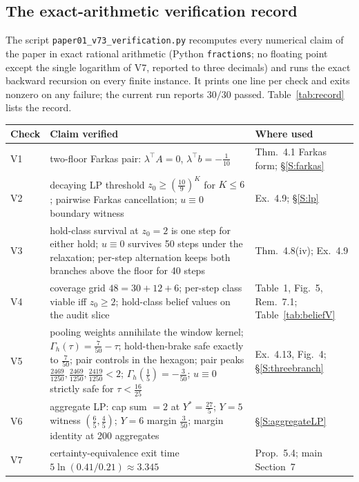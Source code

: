 \documentclass[11pt,a4paper]{article}
\theoremstyle{plain}
\theoremstyle{definition}
\theoremstyle{remark}
\begin{document}
\subsection{The exact-arithmetic verification record}\label{S:record}
The script \texttt{paper01\_v73\_verification.py} recomputes every numerical claim of the paper in exact rational arithmetic (Python \texttt{fractions}; no floating point except the single logarithm of V7, reported to three decimals) and runs the exact backward recursion on every finite instance. It prints one line per check and exits nonzero on any failure; the current run reports $30/30$ passed. Table~\ref{tab:record} lists the record.

\begin{table}[htbp]
\centering\small
\begin{tabularx}{\textwidth}{@{}l>{\raggedright\arraybackslash}X>{\raggedright\arraybackslash}p{}@{}}
\toprule
Check & Claim verified & Where used\\
\midrule
V1 & two-floor Farkas pair: $\lambda^\top A=0$, $\lambda^\top b=-\tfrac1{10}$ & Thm.~4.1 Farkas form; \S\ref{S:farkas}\\
V2 & decaying LP threshold $z_0\ge(\tfrac{10}9)^K$ for $K\le6$; pairwise Farkas cancellation; $u\equiv0$ boundary witness & Ex.~4.9; \S\ref{S:lp}\\
V3 & hold-class survival at $z_0=2$ is one step for either hold; $u\equiv0$ survives 50 steps under the relaxation; per-step alternation keeps both branches above the floor for 40 steps & Thm.~4.8(iv); Ex.~4.9\\
V4 & coverage grid $48=30+12+6$; per-step class viable iff $z_0\ge2$; hold-class belief values on the audit slice & Table~1, Fig.~5, Rem.~7.1; Table~\ref{tab:beliefV}\\
V5 & pooling weights annihilate the window kernel; $\Gamma_h(\tau)=\tfrac7{50}-\tau$; hold-then-brake safe exactly to $\tfrac7{50}$; pair controls in the hexagon; pair peaks $\tfrac{2469}{1250},\tfrac{2469}{1250},\tfrac{2419}{1250}<2$; $\Gamma_h(\tfrac15)=-\tfrac3{50}$; $u\equiv0$ strictly safe for $\tau<\tfrac{16}{25}$ & Ex.~4.13, Fig.~4; \S\ref{S:threebranch}\\
V6 & aggregate LP: cap sum $=2$ at $Y^*=\tfrac{27}5$; $Y=5$ witness $(\tfrac65,\tfrac45)$; $Y=6$ margin $\tfrac3{50}$; margin identity at 200 aggregates & \S\ref{S:aggregateLP}\\
V7 & certainty-equivalence exit time $5\ln(0.41/0.21)\approx3.345$ & Prop.~5.4; main Section~7\\

\end{tabularx}
\end{table}
\end{document}
